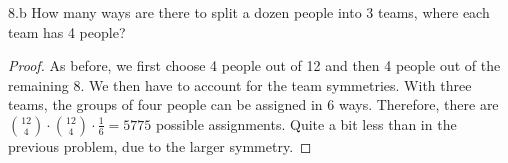 \begin{exercise}{8.b}
How many ways are there to split a dozen people into 3 teams, where each team has 4 people?
\end{exercise}

\begin{proof}
    As before, we first choose 4 people out of 12 and then 4 people out of the remaining 8.
We then have to account for the team symmetries. With three teams, the groups of four people can be assigned in 6 ways. Therefore, there are ${12 \choose 4} \cdot {12 \choose 4} \cdot \frac{1}{6} = 5775$ possible assignments. Quite a bit less than in the previous problem, due to the larger symmetry.

    
\end{proof}


